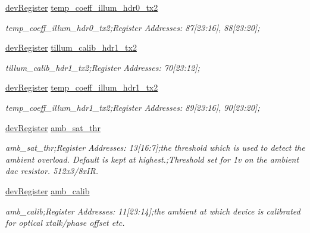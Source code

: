 \begin{DoxyCompactItemize}
\mbox{\hyperlink{classdev_register}{dev\+Register}} \mbox{\hyperlink{class_o_p_t3101_registers_a65a0c09cc22cf048ef644c10dca99f64}{temp\+\_\+coeff\+\_\+illum\+\_\+hdr0\+\_\+tx2}}
\begin{DoxyCompactList}\small\item\em temp\+\_\+coeff\+\_\+illum\+\_\+hdr0\+\_\+tx2;Register Addresses\+: 87\mbox{[}23\+:16\mbox{]}, 88\mbox{[}23\+:20\mbox{]}; \end{DoxyCompactList}\item 
\mbox{\hyperlink{classdev_register}{dev\+Register}} \mbox{\hyperlink{class_o_p_t3101_registers_ad9bcba2b13c84e3c6d5864022c8fa95f}{tillum\+\_\+calib\+\_\+hdr1\+\_\+tx2}}
\begin{DoxyCompactList}\small\item\em tillum\+\_\+calib\+\_\+hdr1\+\_\+tx2;Register Addresses\+: 70\mbox{[}23\+:12\mbox{]}; \end{DoxyCompactList}\item 
\mbox{\hyperlink{classdev_register}{dev\+Register}} \mbox{\hyperlink{class_o_p_t3101_registers_a2e995a33b6bcc6188626590fd18fa529}{temp\+\_\+coeff\+\_\+illum\+\_\+hdr1\+\_\+tx2}}
\begin{DoxyCompactList}\small\item\em temp\+\_\+coeff\+\_\+illum\+\_\+hdr1\+\_\+tx2;Register Addresses\+: 89\mbox{[}23\+:16\mbox{]}, 90\mbox{[}23\+:20\mbox{]}; \end{DoxyCompactList}\item 
\mbox{\hyperlink{classdev_register}{dev\+Register}} \mbox{\hyperlink{class_o_p_t3101_registers_ad246d9e7a194d7bb3de916f7d3f588fd}{amb\+\_\+sat\+\_\+thr}}
\begin{DoxyCompactList}\small\item\em amb\+\_\+sat\+\_\+thr;Register Addresses\+: 13\mbox{[}16\+:7\mbox{]};the threshold which is used to detect the ambient overload. Default is kept at highest.;Threshold set for 1v on the ambient dac resistor. 512x3/8x\+IR. \end{DoxyCompactList}\item 
\mbox{\hyperlink{classdev_register}{dev\+Register}} \mbox{\hyperlink{class_o_p_t3101_registers_a84706d3f7f7c46a9727e59aed0106cc9}{amb\+\_\+calib}}
\begin{DoxyCompactList}\small\item\em amb\+\_\+calib;Register Addresses\+: 11\mbox{[}23\+:14\mbox{]};the ambient at which device is calibrated for optical xtalk/phase offset etc. \end{DoxyCompactList}\item 

\end{DoxyCompactItemize}
